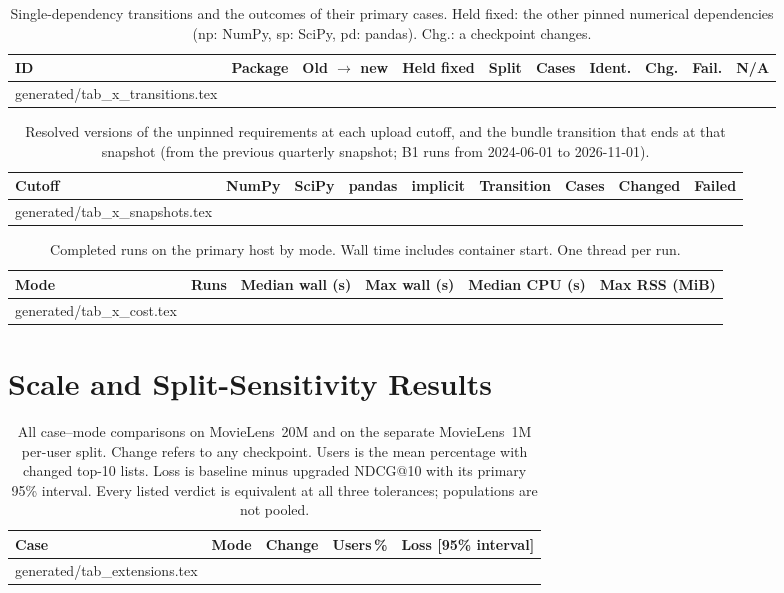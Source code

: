\documentclass[11pt,a4paper]{article}
\makeatletter
\newcommand{\tablebody}[1]{\@@input generated/#1.tex }
\makeatother
\begin{document}
\begin{table}[htbp]
  \centering
  \caption{Single-dependency transitions and the outcomes of their primary
    cases. Held fixed: the other pinned numerical dependencies (np: NumPy,
    sp: SciPy, pd: pandas). Chg.: a checkpoint changes.}
  \label{tab:transitions}
  \scriptsize\setlength{\tabcolsep}{3pt}
  \begin{tabular}{@{}llllrrrrrr@{}}
    \toprule
    ID & Package & Old $\rightarrow$ new & Held fixed & Split & Cases & Ident. & Chg. & Fail. & N/A \\
    \midrule
    \tablebody{tab_x_transitions}
    \bottomrule
  \end{tabular}
\end{table}

\begin{table}[htbp]
  \centering
  \caption{Resolved versions of the unpinned requirements at each upload
    cutoff, and the bundle transition that ends at that snapshot (from the
    previous quarterly snapshot; B1 runs from 2024-06-01 to 2026-11-01).}
  \label{tab:snapshots}
  \scriptsize\setlength{\tabcolsep}{4pt}
  \begin{tabular}{@{}lllllrrrr@{}}
    \toprule
    Cutoff & NumPy & SciPy & pandas & implicit & Transition & Cases & Changed & Failed \\
    \midrule
    \tablebody{tab_x_snapshots}
    \bottomrule
  \end{tabular}
\end{table}

\begin{table}[htbp]
  \centering\small
  \caption{Completed runs on the primary host by mode. Wall time includes
    container start. One thread per run.}
  \label{tab:cost}
  \begin{tabular}{@{}lrrrrr@{}}
    \toprule
    Mode & Runs & Median wall (s) & Max wall (s) & Median CPU (s) & Max RSS (MiB) \\
    \midrule
    \tablebody{tab_x_cost}
    \bottomrule
  \end{tabular}
\end{table}

\section{Scale and Split-Sensitivity Results}
\begin{table}[htbp]
  \centering
  \caption{All case--mode comparisons on MovieLens~20M and on the separate
    MovieLens~1M per-user split. Change refers to any checkpoint. Users is
    the mean percentage with changed top-10 lists. Loss is baseline minus
    upgraded NDCG@10 with its primary 95\% interval. Every listed verdict is
    equivalent at all three tolerances; populations are not pooled.}
  \label{tab:extensions}
  \scriptsize\setlength{\tabcolsep}{3pt}
  \begin{tabular}{@{}lllrl@{}}
    \toprule
    Case & Mode & Change & Users\,\% & Loss [95\% interval] \\
    \midrule
    \tablebody{tab_extensions}
    \bottomrule
  \end{tabular}
\end{table}
\clearpage



\end{document}
